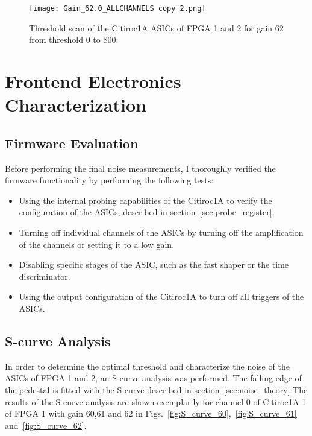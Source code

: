     \begin{figure}[H]
        \centering
        \texttt{[image: Gain\_62.0\_ALLCHANNELS copy 2.png]}
        \caption{Threshold scan of the Citiroc1A ASICs of FPGA 1 and 2 for gain 62 from threshold 0 to 800.}
        \label{fig:threshold_scan_62}
    \end{figure}
    \section{Frontend Electronics Characterization}
    \subsection{Firmware Evaluation}
    Before performing the final noise measurements, I thoroughly verified the firmware functionality by performing the following tests:
    \begin{itemize}
        \item Using the internal probing capabilities of the Citiroc1A to verify the configuration of the ASICs, described in section~\ref{sec:probe_register}.
        \item Turning off individual channels of the ASICs by turning off the amplification of the channels or setting it to a low gain.
        \item Disabling specific stages of the ASIC, such as the fast shaper or the time discriminator.
        \item Using the output configuration of the Citiroc1A to turn off all triggers of the ASICs.
    \end{itemize}
    \subsection{S-curve Analysis}
    In order to determine the optimal threshold and characterize the noise of the ASICs of FPGA 1 and 2, an S-curve analysis was performed.
    \newline
    The falling edge of the pedestal is fitted with the S-curve described in section~\ref{sec:noise_theory}
    \newline
    The results of the S-curve analysis are shown exemplarily for channel 0 of Citiroc1A 1 of FPGA 1 with gain 60,61 and 62 in Figs.~\ref{fig:S_curve_60},~\ref{fig:S_curve_61} and~\ref{fig:S_curve_62}.
    
